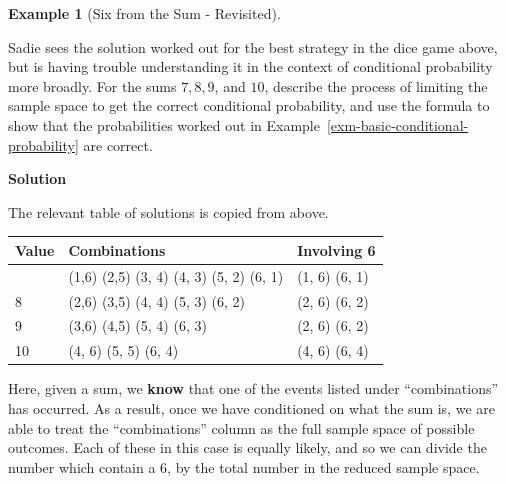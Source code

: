 \documentclass[
  letterpaper,
  DIV=11,
  numbers=noendperiod]{scrreprt}
\theoremstyle{definition}
\theoremstyle{definition}
\newtheorem{example}{Example}[chapter]
\theoremstyle{definition}
\theoremstyle{remark}
\begin{document}
\begin{example}[Six from the Sum -
Revisited]\protect\hypertarget{exm-basic-conditional-probability-rev}{}\label{exm-basic-conditional-probability-rev}

Sadie sees the solution worked out for the best strategy in the dice
game above, but is having trouble understanding it in the context of
conditional probability more broadly. For the sums \(7, 8, 9\), and
\(10\), describe the process of limiting the sample space to get the
correct conditional probability, and use the formula to show that the
probabilities worked out in
Example~\ref{exm-basic-conditional-probability} are correct.

\begin{tcolorbox}[enhanced jigsaw, colback=white, colframe=quarto-callout-color-frame, arc=.35mm, leftrule=.75mm, rightrule=.15mm, opacityback=0, breakable, bottomrule=.15mm, left=2mm, toprule=.15mm]

\vspace{-3mm}\textbf{Solution}\vspace{3mm}

The relevant table of solutions is copied from above.

\begin{longtable}[]{@{}lll@{}}
\toprule\noalign{}
Value & Combinations & Involving 6 \\
\midrule\noalign{}
\endhead
\bottomrule\noalign{}
\endlastfoot
7 & (1,6) (2,5) (3, 4) (4, 3) (5, 2) (6, 1) & (1, 6) (6, 1) \\
8 & (2,6) (3,5) (4, 4) (5, 3) (6, 2) & (2, 6) (6, 2) \\
9 & (3,6) (4,5) (5, 4) (6, 3) & (2, 6) (6, 2) \\
10 & (4, 6) (5, 5) (6, 4) & (4, 6) (6, 4) \\
\end{longtable}

Here, given a sum, we \textbf{know} that one of the events listed under
``combinations'' has occurred. As a result, once we have conditioned on
what the sum is, we are able to treat the ``combinations'' column as the
full sample space of possible outcomes. Each of these in this case is
equally likely, and so we can divide the number which contain a \(6\),
by the total number in the reduced sample space.


\end{tcolorbox}
\end{example}
\end{document}
